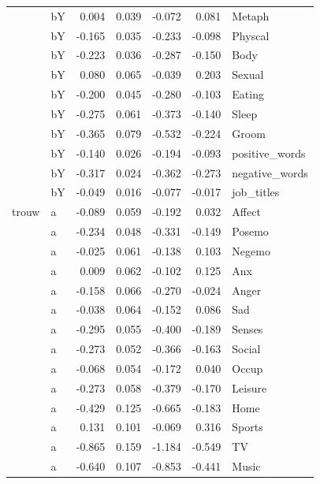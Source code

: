 \documentclass[11pt,a4paper]{article}
\begin{document}
\begin{longtable}{llrrrrl}
   & bY &  0.004 &  0.039 &   -0.072 &     0.081 &          Metaph \\
   & bY & -0.165 &  0.035 &   -0.233 &    -0.098 &         Physcal \\
   & bY & -0.223 &  0.036 &   -0.287 &    -0.150 &            Body \\
   & bY &  0.080 &  0.065 &   -0.039 &     0.203 &          Sexual \\
   & bY & -0.200 &  0.045 &   -0.280 &    -0.103 &          Eating \\
   & bY & -0.275 &  0.061 &   -0.373 &    -0.140 &           Sleep \\
   & bY & -0.365 &  0.079 &   -0.532 &    -0.224 &           Groom \\
   & bY & -0.140 &  0.026 &   -0.194 &    -0.093 &  positive\_words \\
   & bY & -0.317 &  0.024 &   -0.362 &    -0.273 &  negative\_words \\
   & bY & -0.049 &  0.016 &   -0.077 &    -0.017 &      job\_titles \\
trouw & a & -0.089 &  0.059 &   -0.192 &     0.032 &          Affect \\
   & a & -0.234 &  0.048 &   -0.331 &    -0.149 &          Posemo \\
   & a & -0.025 &  0.061 &   -0.138 &     0.103 &          Negemo \\
   & a &  0.009 &  0.062 &   -0.102 &     0.125 &             Anx \\
   & a & -0.158 &  0.066 &   -0.270 &    -0.024 &           Anger \\
   & a & -0.038 &  0.064 &   -0.152 &     0.086 &             Sad \\
   & a & -0.295 &  0.055 &   -0.400 &    -0.189 &          Senses \\
   & a & -0.273 &  0.052 &   -0.366 &    -0.163 &          Social \\
   & a & -0.068 &  0.054 &   -0.172 &     0.040 &           Occup \\
   & a & -0.273 &  0.058 &   -0.379 &    -0.170 &         Leisure \\
   & a & -0.429 &  0.125 &   -0.665 &    -0.183 &            Home \\
   & a &  0.131 &  0.101 &   -0.069 &     0.316 &          Sports \\
   & a & -0.865 &  0.159 &   -1.184 &    -0.549 &              TV \\
   & a & -0.640 &  0.107 &   -0.853 &    -0.441 &           Music \\

\end{longtable}
\end{document}
